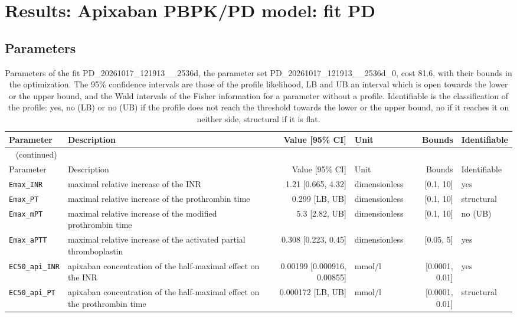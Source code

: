 \section{Results: Apixaban PBPK/PD model: fit PD}

\subsection{Parameters}

\begin{longtable}{llrlrl}
\caption{Parameters of the fit PD\_20261017\_121913\_\_2536d, the parameter set PD\_20261017\_121913\_\_2536d\_0, cost 81.6, with their bounds in the optimization. The 95\% confidence intervals are those of the profile likelihood, LB and UB an interval which is open towards the lower or the upper bound, and the Wald intervals of the Fisher information for a parameter without a profile. Identifiable is the classification of the profile: yes, no (LB) or no (UB) if the profile does not reach the threshold towards the lower or the upper bound, no if it reaches it on neither side, structural if it is flat.}\label{tab:parameters:PD_20261017_121913__2536d} \\
\toprule
Parameter & Description & Value [95\% CI] & Unit & Bounds & Identifiable \\
\midrule
\endfirsthead
\multicolumn{6}{l}{\small\tablename~\thetable{} (continued)} \\
\toprule
Parameter & Description & Value [95\% CI] & Unit & Bounds & Identifiable \\
\midrule
\endhead
\bottomrule
\endlastfoot
\texttt{Emax\_INR} & maximal relative increase of the INR & 1.21 [0.665, 4.32] & dimensionless & [0.1, 10] & yes \\
\texttt{Emax\_PT} & maximal relative increase of the prothrombin time & 0.299 [LB, UB] & dimensionless & [0.1, 10] & structural \\
\texttt{Emax\_mPT} & maximal relative increase of the modified prothrombin time & 5.3 [2.82, UB] & dimensionless & [0.1, 10] & no (UB) \\
\texttt{Emax\_aPTT} & maximal relative increase of the activated partial thromboplastin & 0.308 [0.223, 0.45] & dimensionless & [0.05, 5] & yes \\
\texttt{EC50\_api\_INR} & apixaban concentration of the half-maximal effect on the INR & 0.00199 [0.000916, 0.00855] & mmol/l & [0.0001, 0.01] & yes \\
\texttt{EC50\_api\_PT} & apixaban concentration of the half-maximal effect on the prothrombin time & 0.000172 [LB, UB] & mmol/l & [0.0001, 0.01] & structural \\

\end{longtable}
